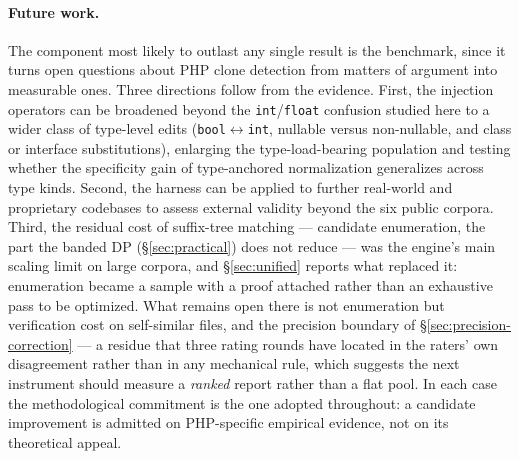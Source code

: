 \documentclass[10pt,a4paper]{article}
\newcounter{prop}[section]
\begin{document}
\paragraph{Future work.} The component most likely to outlast any single result is the benchmark, since
it turns open questions about PHP clone detection from matters of argument into measurable ones. Three
directions follow from the evidence. First, the injection operators can be broadened beyond the
\texttt{int}/\texttt{float} confusion studied here to a wider class of type-level edits
(\texttt{bool}$\leftrightarrow$\texttt{int}, nullable versus non-nullable, and class or interface
substitutions), enlarging the type-load-bearing population and testing whether the specificity gain of
type-anchored normalization generalizes across type kinds. Second, the harness can be applied to
further real-world and proprietary codebases to assess external validity beyond the six public corpora.
Third, the residual cost of suffix-tree matching --- candidate enumeration, the part the banded DP
(\S\ref{sec:practical}) does not reduce --- was the engine's main scaling limit on large corpora, and
\S\ref{sec:unified} reports what replaced it: enumeration became a sample with a proof attached
rather than an exhaustive pass to be optimized. What remains open there is not enumeration but
verification cost on self-similar files, and the precision boundary of
\S\ref{sec:precision-correction} --- a residue that three rating rounds have located in the raters'
own disagreement rather than in any mechanical rule, which suggests the next instrument should
measure a \emph{ranked} report rather than a flat pool. In each case the methodological commitment is
the one adopted throughout: a candidate improvement is admitted on PHP-specific empirical evidence, not on
its theoretical appeal.
\end{document}
